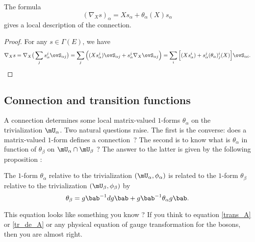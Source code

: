 \begin{proposition}	\label{PropFormnabXthe}
The formula
\begin{equation}\label{eq:nab_theta}
   (\nabla_Xs)_{\alpha}=Xs_{\alpha}+\theta_{\alpha}(X)s_{\alpha}
\end{equation}
gives a local description of the connection. 
\label{prop:namba_theta_u}
\end{proposition}

\begin{proof}
For any $s\in\Gamma(E)$, we have
\begin{equation}
\nabla_Xs=\nabla_X\big(  \sum_j s^j_{\alpha}\ovS_{\alpha j}  \big)
         =\sum_j\Big(  (Xs_{\alpha}^j)\ovS_{\alpha j} + s^j_{\alpha}\nabla_X\ovS_{\alpha j}     \Big)
	 =\sum_i\Big[   (Xs_{\alpha}^i)+s_{\alpha}^j(\theta_{\alpha})_j^i(X)  \Big]\ovS_{\alpha i}.
\end{equation}
\end{proof}

\subsection{Connection and transition functions}

A connection determines some local matrix-valued $1$-forms $\theta_{\alpha}$ on the trivialization $\mU_{\alpha}$. Two natural questions raise. The first is the converse: does a matrix-valued $1$-form defines a connection~? The second is to know  what is $\theta_{\alpha}$ in function of $\theta_{\beta}$ on $\mU_{\alpha}\cap\mU_{\beta}$ ? The answer to the latter is  given by the following proposition :

\begin{proposition}
The $1$-form $\theta_{\alpha}$ relative to the trivialization $(\mU_{\alpha},\phi_{\alpha})$ is related to the $1$-form $\theta_{\beta}$ relative to the trivialization $(\mU_{\beta},\phi_{\beta})$ by
\begin{equation}\label{eq:theta_g}
  \theta_{\beta}=g\bab^{-1} dg\bab+g\bab^{-1}\theta_{\alpha} g\bab.
\end{equation}
\end{proposition}

This equation looks like something you know ? If you think to equation \eqref{trans_A} or \eqref{tr_de_A} or any physical equation of gauge transformation for the bosons, then you are almost right.
 
